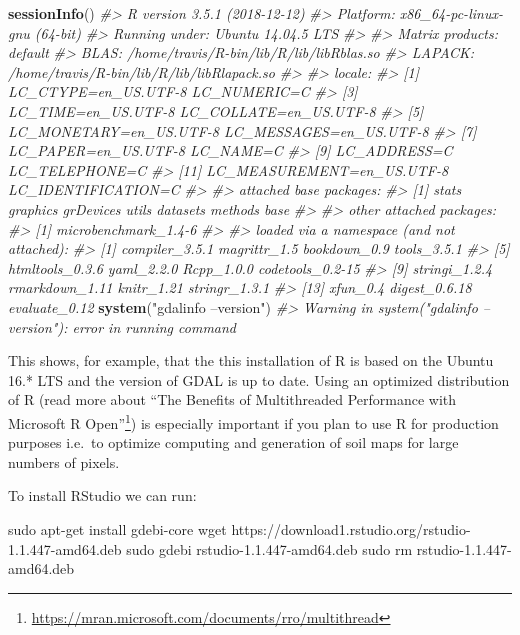 \documentclass[graybox,natbib,nospthms,UStrade]{svmono}
\newenvironment{Shaded}{\begin{snugshade}}{\end{snugshade}}
\newcommand{\CommentTok}[1]{\textcolor[rgb]{0.37,0.37,0.37}{\textit{#1}}}
\newcommand{\FunctionTok}[1]{\textcolor[rgb]{0,0,0}{#1}}
\newcommand{\KeywordTok}[1]{\textcolor[rgb]{0.27,0.27,0.27}{\textbf{#1}}}
\newcommand{\NormalTok}[1]{#1}
\newcommand{\StringTok}[1]{\textcolor[rgb]{0.5,0.5,0.5}{#1}}
\renewcommand{\href}[2]{#2 (\url{#1})}
\renewcommand{\href}[2]{#2\footnote{\url{#1}}}
\begin{document}
\begin{Shaded}
\begin{Highlighting}[]
\KeywordTok{sessionInfo}\NormalTok{()}
\CommentTok{#> R version 3.5.1 (2018-12-12)}
\CommentTok{#> Platform: x86_64-pc-linux-gnu (64-bit)}
\CommentTok{#> Running under: Ubuntu 14.04.5 LTS}
\CommentTok{#> }
\CommentTok{#> Matrix products: default}
\CommentTok{#> BLAS: /home/travis/R-bin/lib/R/lib/libRblas.so}
\CommentTok{#> LAPACK: /home/travis/R-bin/lib/R/lib/libRlapack.so}
\CommentTok{#> }
\CommentTok{#> locale:}
\CommentTok{#>  [1] LC_CTYPE=en_US.UTF-8       LC_NUMERIC=C              }
\CommentTok{#>  [3] LC_TIME=en_US.UTF-8        LC_COLLATE=en_US.UTF-8    }
\CommentTok{#>  [5] LC_MONETARY=en_US.UTF-8    LC_MESSAGES=en_US.UTF-8   }
\CommentTok{#>  [7] LC_PAPER=en_US.UTF-8       LC_NAME=C                 }
\CommentTok{#>  [9] LC_ADDRESS=C               LC_TELEPHONE=C            }
\CommentTok{#> [11] LC_MEASUREMENT=en_US.UTF-8 LC_IDENTIFICATION=C       }
\CommentTok{#> }
\CommentTok{#> attached base packages:}
\CommentTok{#> [1] stats     graphics  grDevices utils     datasets  methods   base     }
\CommentTok{#> }
\CommentTok{#> other attached packages:}
\CommentTok{#> [1] microbenchmark_1.4-6}
\CommentTok{#> }
\CommentTok{#> loaded via a namespace (and not attached):}
\CommentTok{#>  [1] compiler_3.5.1   magrittr_1.5     bookdown_0.9     tools_3.5.1     }
\CommentTok{#>  [5] htmltools_0.3.6  yaml_2.2.0       Rcpp_1.0.0       codetools_0.2-15}
\CommentTok{#>  [9] stringi_1.2.4    rmarkdown_1.11   knitr_1.21       stringr_1.3.1   }
\CommentTok{#> [13] xfun_0.4         digest_0.6.18    evaluate_0.12}
\KeywordTok{system}\NormalTok{(}\StringTok{"gdalinfo --version"}\NormalTok{)}
\CommentTok{#> Warning in system("gdalinfo --version"): error in running command}
\end{Highlighting}
\end{Shaded}

This shows, for example, that the this installation of R is based on the Ubuntu 16.* LTS and the version of GDAL is up to date. Using an optimized distribution of R (read more about \href{https://mran.microsoft.com/documents/rro/multithread}{``The Benefits of Multithreaded Performance with Microsoft R Open''}) is especially important if you plan to use R for production purposes i.e.~to optimize computing and generation of soil maps for large numbers of pixels.

To install RStudio we can run:

\begin{Shaded}
\begin{Highlighting}[]
\FunctionTok{sudo}\NormalTok{ apt-get install gdebi-core}
\FunctionTok{wget}\NormalTok{ https://download1.rstudio.org/rstudio-1.1.447-amd64.deb }
\FunctionTok{sudo}\NormalTok{ gdebi rstudio-1.1.447-amd64.deb}
\FunctionTok{sudo}\NormalTok{ rm rstudio-1.1.447-amd64.deb}
\end{Highlighting}
\end{Shaded}
\end{document}
